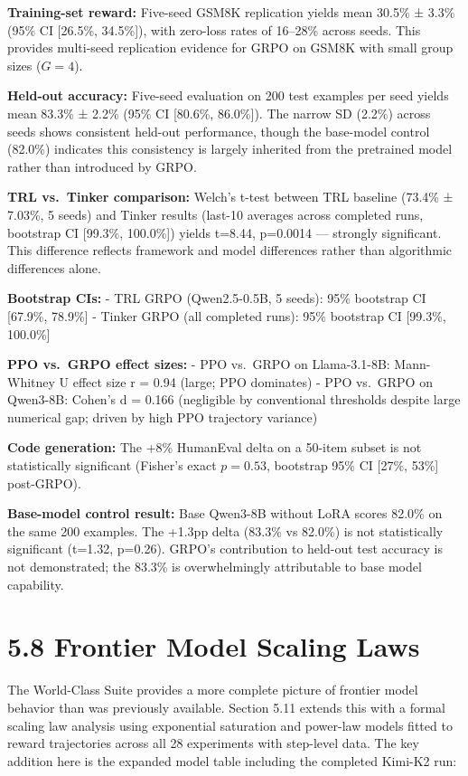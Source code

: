 \documentclass[
  american,
  11pt,
  a4paper,
  oneside]{report}
\begin{document}
\textbf{Training-set reward:} Five-seed GSM8K replication yields mean
30.5\% ± 3.3\% (95\% CI {[}26.5\%, 34.5\%{]}), with zero-loss rates of
16--28\% across seeds. This provides multi-seed replication evidence for
GRPO on GSM8K with small group sizes (\(G{=}4\)).

\textbf{Held-out accuracy:} Five-seed evaluation on 200 test examples
per seed yields mean 83.3\% ± 2.2\% (95\% CI {[}80.6\%, 86.0\%{]}). The
narrow SD (2.2\%) across seeds shows consistent held-out performance,
though the base-model control (82.0\%) indicates this consistency is
largely inherited from the pretrained model rather than introduced by
GRPO.

\textbf{TRL vs.~Tinker comparison:} Welch's t-test between TRL baseline
(73.4\% ± 7.03\%, 5 seeds) and Tinker results (last-10 averages across
completed runs, bootstrap CI {[}99.3\%, 100.0\%{]}) yields t=8.44,
p=0.0014 --- strongly significant. This difference reflects framework
and model differences rather than algorithmic differences alone.

\textbf{Bootstrap CIs:} - TRL GRPO (Qwen2.5-0.5B, 5 seeds): 95\%
bootstrap CI {[}67.9\%, 78.9\%{]} - Tinker GRPO (all completed runs):
95\% bootstrap CI {[}99.3\%, 100.0\%{]}

\textbf{PPO vs.~GRPO effect sizes:} - PPO vs.~GRPO on Llama-3.1-8B:
Mann-Whitney U effect size r = 0.94 (large; PPO dominates) - PPO
vs.~GRPO on Qwen3-8B: Cohen's d = 0.166 (negligible by conventional
thresholds despite large numerical gap; driven by high PPO trajectory
variance)

\textbf{Code generation:} The +8\% HumanEval delta on a 50-item subset
is not statistically significant (Fisher's exact \(p{=}0.53\), bootstrap
95\% CI {[}27\%, 53\%{]} post-GRPO).

\textbf{Base-model control result:} Base Qwen3-8B without LoRA scores
82.0\% on the same 200 examples. The +1.3pp delta (83.3\% vs 82.0\%) is
not statistically significant (t=1.32, p=0.26). GRPO's contribution to
held-out test accuracy is not demonstrated; the 83.3\% is overwhelmingly
attributable to base model capability.

\section{5.8 Frontier Model Scaling
Laws}\label{frontier-model-scaling-laws}

The World-Class Suite provides a more complete picture of frontier model
behavior than was previously available. Section 5.11 extends this with a
formal scaling law analysis using exponential saturation and power-law
models fitted to reward trajectories across all 28 experiments with
step-level data. The key addition here is the expanded model table
including the completed Kimi-K2 run:
\end{document}
